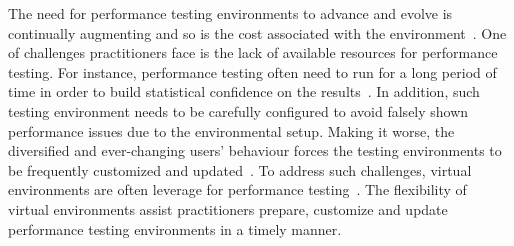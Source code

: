 
The need for performance testing environments to advance and evolve is continually augmenting and so is the cost associated with the environment~\cite{stpmag, bertolino2007software}. One of challenges practitioners face is the lack of available resources for performance testing. For instance, performance testing often need to run for a long period of time in order to build statistical confidence on the results~\cite{ranjanbook}. In addition, such testing environment needs to be carefully configured to avoid falsely shown performance issues due to the environmental setup. Making it worse, the diversified and ever-changing users' behaviour forces the testing environments to be frequently customized and updated~\cite{Syer2016}. To address such challenges, virtual environments are often leverage for performance testing~\cite{whyvirtualisbetter, vmwarehighcost}. The flexibility of virtual environments assist practitioners prepare, customize and update performance testing environments in a timely manner.





